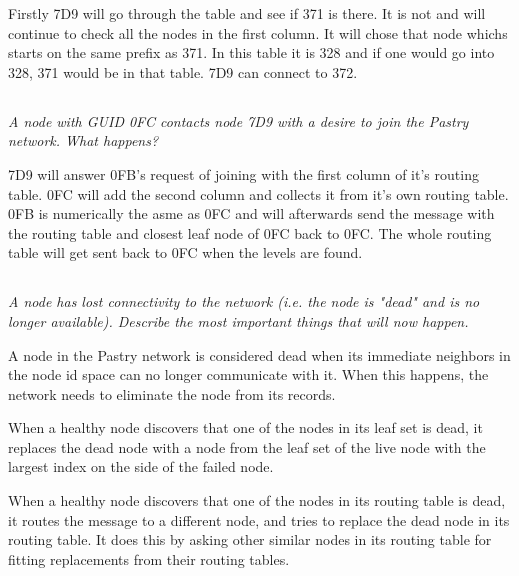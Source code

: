 \documentclass{article}
\newcommand{\question}[1]{\subsection{}\textit{#1}\bigskip}
\begin{document}
Firstly 7D9 will go through the table and see if 371 is there. It is not and will continue to check all the nodes in the first column. It will chose that node whichs starts on the same prefix as 371. In this table it is 328 and if one would go into 328, 371 would be in that table. 7D9 can connect to 372.

\question{A node with GUID 0FC contacts node 7D9 with a desire to join the Pastry network. What happens?}

7D9 will answer 0FB's request of joining with the first column of it's routing table. 0FC will add the second column and collects it from it's own routing table. 0FB is numerically the asme as 0FC and will afterwards send the message with the routing table and closest leaf node of 0FC back to 0FC. The whole routing table will get sent back to 0FC when the levels are found.

\question{A node has lost connectivity to the network (i.e. the node is "dead" and is no longer available). Describe the most important things that will now happen.}

A node in the Pastry network is considered dead when its immediate neighbors in the node id space can no longer communicate with it.
When this happens, the network needs to eliminate the node from its records.

When a healthy node discovers that one of the nodes in its leaf set is dead, it replaces the dead node with a node from the leaf set of the live node with the largest index on the side of the failed node.

When a healthy node discovers that one of the nodes in its routing table is dead, it routes the message to a different node, and tries to replace the dead node in its routing table.
It does this by asking other similar nodes in its routing table for fitting replacements from their routing tables.
\end{document}

